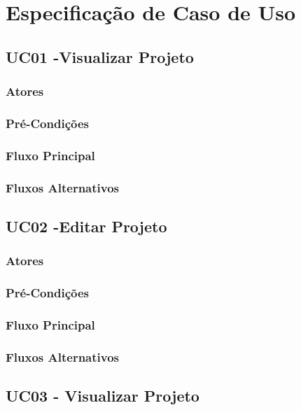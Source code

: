 \chapter{Especificação de Caso de Uso}


\section{UC01 -Visualizar Projeto}

\subsection{Atores}

\subsection{Pré-Condições}

\subsection{Fluxo Principal}

\subsection{Fluxos Alternativos}


\section{UC02 -Editar Projeto}

\subsection{Atores}

\subsection{Pré-Condições}

\subsection{Fluxo Principal}

\subsection{Fluxos Alternativos}



\section{UC03 - Visualizar Projeto}

